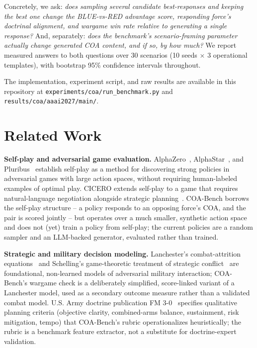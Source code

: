 \documentclass[sigconf]{acmart}
\begin{document}
Concretely, we ask: \emph{does sampling several candidate best-responses and keeping the best one change the BLUE-vs-RED advantage score, responding force's doctrinal alignment, and wargame win rate relative to generating a single response?} And, separately: \emph{does the benchmark's scenario-framing parameter actually change generated COA content, and if so, by how much?} We report measured answers to both questions over 30 scenarios (10 seeds $\times$ 3 operational templates), with bootstrap 95\% confidence intervals throughout.

The implementation, experiment script, and raw results are available in this repository at \texttt{experiments/coa/run\_benchmark.py} and \texttt{results/coa/aaai2027/main/}.

\section{Related Work}

\textbf{Self-play and adversarial game evaluation.} AlphaZero~\cite{silver2018alphazero}, AlphaStar~\cite{vinyals2019alphastar}, and Pluribus~\cite{brown2019superhuman} establish self-play as a method for discovering strong policies in adversarial games with large action spaces, without requiring human-labeled examples of optimal play. CICERO extends self-play to a game that requires natural-language negotiation alongside strategic planning~\cite{bakhtin2022cicero}. COA-Bench borrows the self-play structure -- a policy responds to an opposing force's COA, and the pair is scored jointly -- but operates over a much smaller, synthetic action space and does not (yet) train a policy from self-play; the current policies are a random sampler and an LLM-backed generator, evaluated rather than trained.

\textbf{Strategic and military decision modeling.} Lanchester's combat-attrition equations~\cite{lanchester1916} and Schelling's game-theoretic treatment of strategic conflict~\cite{schelling1960} are foundational, non-learned models of adversarial military interaction; COA-Bench's wargame check is a deliberately simplified, score-linked variant of a Lanchester model, used as a secondary outcome measure rather than a validated combat model. U.S. Army doctrine publication FM 3-0~\cite{fm30} specifies qualitative planning criteria (objective clarity, combined-arms balance, sustainment, risk mitigation, tempo) that COA-Bench's rubric operationalizes heuristically; the rubric is a benchmark feature extractor, not a substitute for doctrine-expert validation.
\end{document}
